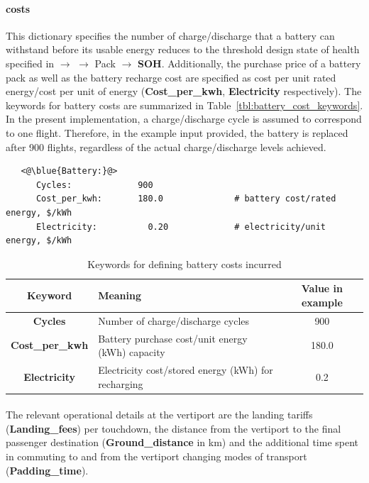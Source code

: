 \paragraph{ costs}
This dictionary specifies the number of charge/discharge  that a battery can withstand before its usable energy reduces to the threshold design state of health specified in  $\rightarrow$  $\rightarrow$ Pack $\rightarrow$ \textbf{SOH}. Additionally, the purchase price of a battery pack as well as the battery recharge cost are specified as cost per unit rated energy/cost per unit of energy (\textbf{Cost\_per\_kwh}, \textbf{Electricity} respectively). The keywords for battery costs are summarized in Table~\ref{tbl:battery_cost_keywords}. In the present implementation, a charge/discharge cycle is assumed to correspond to one flight. Therefore, in the example input provided, the battery is replaced after 900 flights, regardless of the actual charge/discharge levels achieved.

\begin{lstlisting}
   <@\blue{Battery:}@>
      Cycles:             900
      Cost_per_kwh:       180.0              # battery cost/rated energy, $/kWh
      Electricity:          0.20             # electricity/unit energy, $/kWh
\end{lstlisting}

\begin{table}[H]
\begin{center}
	\caption{Keywords for defining battery costs incurred}
	\label{tbl:hourly_keywords}
    \begin{tabular}{| c | l | c |}
    \hline
    Keyword & Meaning & Value in example \\ 
    \hline
\textbf{Cycles} & Number of charge/discharge cycles &  900 \\
\textbf{Cost\_per\_kwh} & Battery purchase cost/unit energy (kWh) capacity &  180.0\\
\textbf{Electricity} & Electricity cost/stored energy (kWh) for recharging &  0.2\\
     \hline
  \end{tabular}
\end{center}
\end{table}
\vspace{-1.5cm}
\paragraph{}
The relevant operational details at the vertiport are the landing tariffs (\textbf{Landing\_fees}) per touchdown, the distance from the vertiport to the final passenger destination (\textbf{Ground\_distance} in km) and the additional time spent in commuting to and from the vertiport changing modes of transport (\textbf{Padding\_time}).

